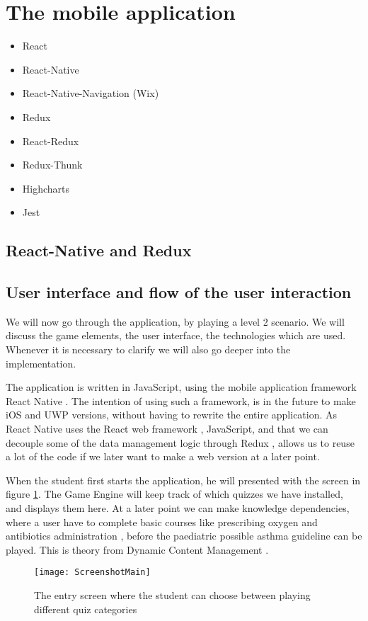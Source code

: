 \section{The mobile application}
\begin{itemize}
	\item React
	\item React-Native
	\item React-Native-Navigation (Wix)
	\item Redux
	\item React-Redux
	\item Redux-Thunk
	\item Highcharts
	\item Jest
\end{itemize}
\subsection{React-Native and Redux}
\subsection{User interface and flow of the user interaction}

We will now go through the application, by playing a level 2 scenario. We will discuss the game elements, the user interface, the technologies which are used. Whenever it is necessary to clarify we will also go deeper into the implementation.

The application is written in JavaScript, using the mobile application framework React Native \parencite{ReactNative}. The intention of using such a framework, is in the future to make iOS and UWP versions, without having to rewrite the entire application. As React Native uses the React web framework \parencite{React}, JavaScript, and that we can decouple some of the data management logic through Redux \parencite{Redux}, allows us to reuse a lot of the code if we later want to make a web version at a later point.

When the student first starts the application, he will presented with the screen in figure \ref{fig:ScreenshotMain}. The Game Engine will keep track of which quizzes we have installed, and displays them here. At a later point we can make knowledge dependencies, where a user have to complete basic courses like prescribing oxygen \parencite{RepublicofKeny2016} and antibiotics administration \parencite{RepublicofKeny2016}, before the paediatric possible asthma guideline \parencite{RepublicofKeny2016} can be played. This is theory from Dynamic Content Management \parencite{Eide2008}.
\begin{figure}[h!]
	\caption {The entry screen where the student can choose between playing different quiz categories}
	\label{fig:ScreenshotMain}
	\texttt{[image: ScreenshotMain]}
\end{figure}

